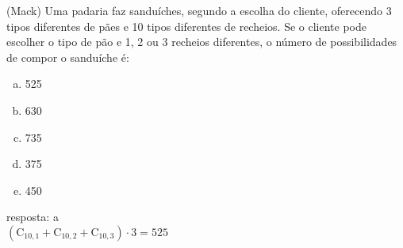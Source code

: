 \begin{ex}
 (Mack) Uma padaria faz sanduíches, segundo a escolha do cliente, oferecendo 3 tipos diferentes de pães e 10 tipos diferentes de recheios. Se o cliente pode escolher o tipo de pão e 1, 2 ou 3 recheios diferentes, o número de possibilidades de compor o sanduíche é:
   \begin{enumerate}  [(a)]
       \item 525
       \item 630
       \item 735
       \item 375
       \item 450
   \end{enumerate}
    \begin{sol}
    resposta: a \\
    $(\mathrm{C}_{{10},1}+\mathrm{C}_{{10},2}+\mathrm{C}_{{10},3})\cdot3=525$
    \end{sol}
\end{ex}